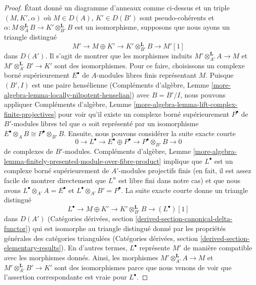 \begin{proof}
\medskip\noindent
Étant donné un diagramme d'anneaux comme ci-dessus et un triple
$(M, K', \alpha)$ où $M \in D(A)$, $K' \in D(B')$ sont
pseudo-cohérents et
$\alpha : M \otimes_A^\mathbf{L} B \to K' \otimes_{B'}^\mathbf{L} B$
est un isomorphisme, supposons que nous ayons un triangle distingué
$$
M' \to M \oplus K' \to K' \otimes_{B'}^\mathbf{L} B \to M'[1]
$$
dans $D(A')$. Il s'agit de montrer que les morphismes induits
$M' \otimes_{A'}^\mathbf{L} A \to M$ et
$M' \otimes_{A'}^\mathbf{L} B' \to K'$ sont des isomorphismes.
Pour ce faire, choisissons un complexe borné supérieurement
$E^\bullet$ de $A$-modules libres finis représentant $M$.
Puisque $(B', I)$ est une paire hensélienne
(Compléments d'algèbre, Lemme \ref{more-algebra-lemma-locally-nilpotent-henselian})
avec $B = B'/I$, nous pouvons appliquer Compléments d'algèbre, Lemme
\ref{more-algebra-lemma-lift-complex-finite-projectives}
pour voir qu'il existe un complexe borné supérieurement $P^\bullet$
de $B'$-modules libres tel que $\alpha$ soit représenté
par un isomorphisme $E^\bullet \otimes_A B \cong P^\bullet \otimes_{B'} B$.
Ensuite, nous pouvons considérer la suite exacte courte
$$
0 \to L^\bullet \to
E^\bullet \oplus P^\bullet \to P^\bullet \otimes_{B'} B \to 0
$$
de complexes de $B'$-modules.  
Compléments d'algèbre, Lemme  
\ref{more-algebra-lemma-finitely-presented-module-over-fibre-product}  
implique que $L^\bullet$ est un complexe borné supérieurement de  
$A'$-modules projectifs finis  
(en fait, il est assez facile de montrer directement que $L^n$ est libre fini  
dans notre cas) et que nous avons  
$L^\bullet \otimes_{A'} A = E^\bullet$ et  
$L^\bullet \otimes_{A'} B' = P^\bullet$.  
La suite exacte courte donne un triangle distingué  
$$
L^\bullet \to M \oplus K' \to K' \otimes_{B'}^\mathbf{L} B \to (L^\bullet)[1]
$$  
dans $D(A')$ (Catégories dérivées, section  
\ref{derived-section-canonical-delta-functor}) qui est isomorphe  
au triangle distingué donné par les propriétés générales des  
catégories triangulées (Catégories dérivées, section  
\ref{derived-section-elementary-results}). En d'autres termes, $L^\bullet$  
représente $M'$ de manière compatible avec les morphismes donnés. Ainsi, les morphismes  
$M' \otimes_{A'}^\mathbf{L} A \to M$ et  
$M' \otimes_{A'}^\mathbf{L} B' \to K'$ sont  
des isomorphismes parce que nous venons de voir que l'assertion correspondante est vraie pour $L^\bullet$.  
\end{proof}







